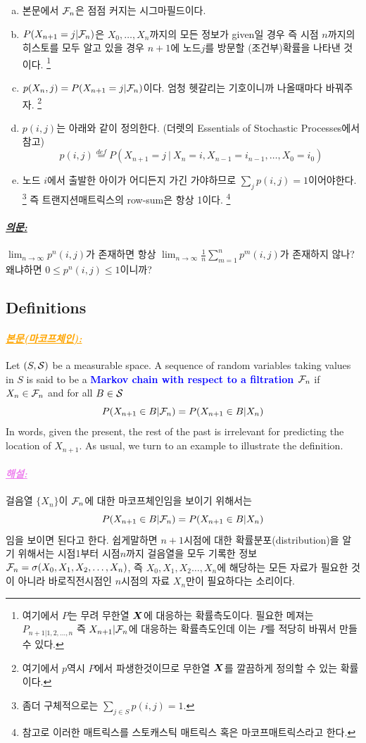 \documentclass[12pt,oneside,english,a4paper]{article}
\newcommand{\para}[1]{\paragraph{\LARGE\it\underline{\textbf{#1:}}}\LARGE}
\newcommand{\paraviolet}[1]{\paragraph{\LARGE\textcolor{violet}{\it\underline{\textbf{#1:}}}}\LARGE}
\newcommand{\paraorange}[1]{\paragraph{\LARGE\textcolor{orange}{\it\underline{\textbf{#1:}}}}\LARGE}
\newcommand{\bsX}{\mbox{\boldmath $X$}}
\begin{document}
\begin{enumerate}[(a)]
\item 본문에서 ${\cal F}_n$은 점점 커지는 시그마필드이다.
\item $P(X_{n+1}=j|{\cal F}_n)$은 $X_0,\dots,X_{n}$까지의 모든 정보가 given일 경우 즉 시점 $n$까지의 히스토를 모두 알고 있을 경우 $n+1$에 노드$j$를 방문할 (조건부)확률을 나타낸 것이다. \footnote{여기에서 $P$는 무려 무한열 $\bsX$에 대응하는 확률측도이다. 필요한 메져는 $P_{n+1 | 1,2,\dots,n}$ 즉 $X_{n+1}|{\cal F}_n$에 대응하는 확률측도인데 이는 $P$를 적당히 바꿔서 만들 수 있다.}
\item $p(X_n,j)=P(X_{n+1}=j|{\cal F}_n)$이다. 엄청 헷갈리는 기호이니까 나올때마다 바꿔주자. \footnote{여기에서 $p$역시 $P$에서 파생한것이므로 무한열 $\bsX$를 깔끔하게 정의할 수 있는 확률이다.}
\item $p(i,j)$는 아래와 같이 정의한다. (더렛의 Essentials of Stochastic Processes에서 참고) 
\[
p(i,j)\overset{def}{=}P(X_{n+1}=j ~|~ X_n=i,X_{n-1}=i_{n-1},\dots,X_0=i_0)
\]
\item 노드 $i$에서 출발한 아이가 어디든지 가긴 가야하므로 $\sum_{j}p(i,j)=1$이어야한다.  \footnote{좀더 구체적으로는 $\sum_{j\in S}p(i,j)=1$.} 즉 트랜지션매트릭스의 row-sum은 항상 1이다. \footnote{참고로 이러한 매트릭스를 스토캐스틱 매트릭스 혹은 마코프매트릭스라고 한다.}
\end{enumerate}

\para{의문} $\lim_{n\to\infty}p^n(i,j)$가 존재하면 항상 $\lim_{n\to\infty}\frac{1}{n}\sum_{m=1}^{n}p^m(i,j)$가 존재하지 않나? 왜냐하면 $0 \leq p^{n}(i,j)\leq 1$이니까?

\subsection{Definitions}
\paraorange{본문(마코프체인)} Let $(S,{\cal S})$ be a measurable space. A sequence of random variables taking values in $S$ is said to be a \textcolor{blue}{\bf Markov chain with respect to a filtration ${\cal F}_n$} if $X_n \in {\cal F}_n$ and for all $B \in {\cal S}$
\[
P(X_{n+1}\in B | {\cal F}_n)=P(X_{n+1}\in B |X_n)
\]
In words, given the present, the rest of the past is irrelevant for predicting the location of $X_{n+1}$. As usual, we turn to an example to illustrate the definition. 

\paraviolet{해설} 걸음열 $\{X_n\}$이 ${\cal F}_n$에 대한 마코프체인임을 보이기 위해서는 
\[
P(X_{n+1}\in B | {\cal F}_n)= P(X_{n+1}\in B |X_n)
\]
임을 보이면 된다고 한다. 쉽게말하면 $n+1$시점에 대한 확률분포(distribution)을 알기 위해서는 시점1부터 시점$n$까지 걸음열을 모두 기록한 정보 ${\cal F}_n=\sigma(X_0,X_1,X_2,\dots,X_n)$, 즉 $X_0,X_1,X_2\dots,X_n$에 해당하는 모든 자료가 필요한 것이 아니라 바로직전시점인 $n$시점의 자료 $X_n$만이 필요하다는 소리이다. 
\end{document}
